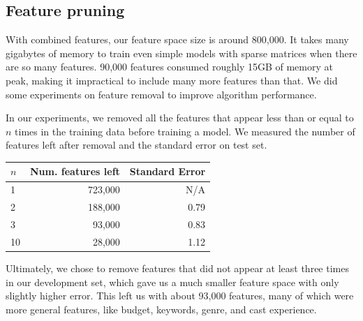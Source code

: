 \documentclass[journal]{IEEEtran}
\begin{document}
\subsection{Feature pruning}
With combined features, our feature space size is around 800,000. It takes many gigabytes of memory to train even simple models with sparse matrices when there are so many features.  90,000 features consumed roughly 15GB of memory at peak, making it impractical to include many more features than that.   We did some experiments on feature removal to improve algorithm performance.
\\
\par In our experiments, we removed all the features that appear less than or equal to $n$ times in the training data before training a model. We measured the number of features left after removal and the standard error on test set.\\
\begin{center}
\begin{tabular}{|l| r r|} %
\hline
$n$ & Num. features left & Standard Error  \\ [0.5ex] %
\hline
1 & 723,000 & N/A \\
2 & 188,000 & 0.79 \\
3 & 93,000  & 0.83 \\
10 & 28,000  & 1.12 \\
\hline %
\end{tabular}
\end{center}
\smallskip

\par Ultimately, we chose to remove features that did not appear at least three times in our development set, which gave us a much smaller feature space with only slightly higher error.  This left us with about 93,000 features, many of which were more general features, like budget, keywords, genre, and cast experience.
\end{document}
